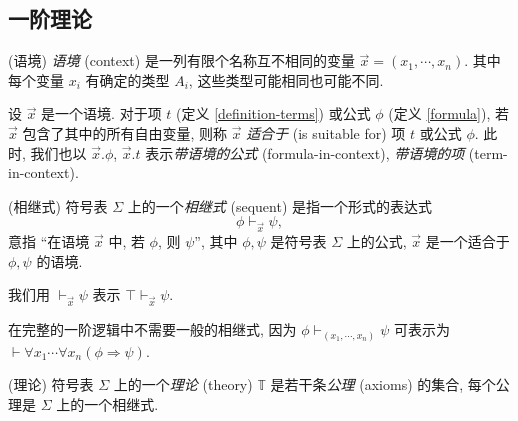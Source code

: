 \subsection{一阶理论}

\begin{definition}
	[label={definition-context}]
	{(语境)}
	\emph{语境} (context) 是一列有限个名称互不相同的变量 $\vec x = (x_1,\cdots,x_n)$. 其中每个变量 $x_i$ 有确定的类型 $A_i$, 这些类型可能相同也可能不同.
	
	设 $\vec x$ 是一个语境. 对于项 $t$ (定义 \ref{definition-terms}) 或公式 $\phi$ (定义 \ref{formula}), 若 $\vec x$ 包含了其中的所有自由变量, 则称 $\vec x$ \emph{适合于} (is suitable for) 项 $t$ 或公式 $\phi$.
	此时, 我们也以 $\vec x.\phi$, $\vec x.t$ 表示\emph{带语境的公式} (formula-in-context), \emph{带语境的项} (term-in-context).
\end{definition}


\begin{definition}
	[label={sequents}]
	{(相继式)}
	符号表 $\Sigma$ 上的一个\emph{相继式} (sequent) 是指一个形式的表达式
	$$
	\phi \vdash_{\vec x} \psi,
	$$
	意指 ``在语境 $\vec x$ 中, 若 $\phi$, 则 $\psi$'', 其中 $\phi,\psi$ 是符号表 $\Sigma$ 上的公式,
	$\vec x$ 是一个适合于 $\phi,\psi$ 的语境.
	
	我们用 $\vdash_{\vec x} \psi$ 表示 $\top\vdash_{\vec x} \psi$.
\end{definition}

\begin{remark}
	[label={remark-full-first-order-logic-no-need-sequents}]
	{}
	在完整的一阶逻辑中不需要一般的相继式, 因为
	$\phi \vdash_{(x_1,\cdots,x_n)} \psi$ 可表示为
	$\vdash \forall x_1\cdots \forall x_n (\phi\Rightarrow \psi)$.
\end{remark}

\begin{definition}
	[label={theory-on-signature}]
	{(理论)}
	符号表 $\Sigma$ 上的一个\emph{理论} (theory) $\mathbb T$ 是若干条\emph{公理} (axioms) 的集合, 每个公理是 $\Sigma$ 上的一个相继式.
\end{definition}

